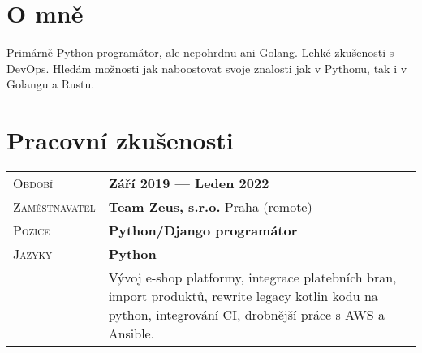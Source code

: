\documentclass[a4paper, oneside, final]{scrartcl} %
\newcommand{\gray}{\rowcolor[gray]{.90}} %
\begin{document}
\begin{center} %


{\fontsize{36}{36}\selectfont\scshape{}} %

\vspace{1.5cm} %


\section{O mně}

Primárně Python programátor, ale nepohrdnu ani Golang. Lehké zkušenosti s DevOps. Hledám možnosti jak naboostovat svoje znalosti jak v Pythonu, tak i v Golangu a Rustu.\\


\section{Pracovní zkušenosti}

\begin{tabularx}{0.97\linewidth}{>{\raggedleft\scshape}p{2cm}X}
\gray Období & \textbf{Září 2019 --- Leden 2022}\\
\gray Zaměstnavatel & \textbf{Team Zeus, s.r.o.} \hfill Praha (remote)\\
\gray Pozice & \textbf{Python/Django programátor}\\
\gray Jazyky & \textbf{Python}\\
       & Vývoj e-shop platformy, integrace platebních bran, import produktů, rewrite legacy kotlin kodu na python, integrování CI, drobnější práce s AWS a Ansible.
\end{tabularx}

\vspace{12pt}


\end{center}
\end{document}
